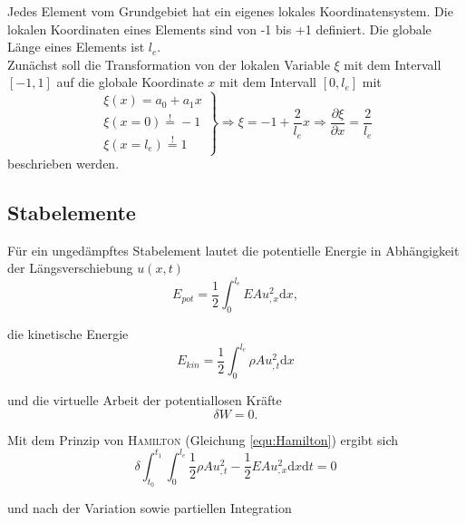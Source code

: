 \documentclass[a4paper,10pt,twoside]{article}
\numberwithin{equation}{section} %
\numberwithin{figure}{section}   %
\numberwithin{table}{section}    %
\begin{document}
	Jedes Element vom Grundgebiet hat ein eigenes lokales Koordinatensystem. Die lokalen Koordinaten eines Elements sind von -1 bis +1 definiert. Die globale Länge eines Elements ist $ l_{e} $.\\
	Zunächst soll die Transformation von der lokalen Variable $\xi$ mit dem Intervall $[-1,1]$ auf die globale Koordinate $x$ mit dem Intervall $ [0,l_{e}] $ mit 
	\begin{equation}\label{equ:lokal-zu-global}
	\left. 
	\begin{array}{l}
	\xi (x) = a_{0} + a_{1}x\\
	\xi (x=0) \overset{!}{=} -1\\
	\xi (x=l_{e})  \overset{!}{=} 1
	\end{array} 
	\right\rbrace \Rightarrow 
	\xi = -1 + \frac{2}{l_{e}}x
	\Rightarrow
	\frac{\partial \xi}{\partial x} = \frac{2}{l_{e}}
	\end{equation}
	beschrieben werden.
	
	\subsection{Stabelemente}\label{sec:längsschwingung-von-stab}
	Für ein ungedämpftes Stabelement lautet die potentielle Energie in Abhängigkeit der Längsverschiebung
	 $ u(x,t) $
	\begin{equation}\label{equ:Stab-pot-Energie}
	E_{pot} = \frac{1}{2} \int_{0}^{l_{e}} EA u_{,x}^{2} \mathrm{d}x,
	\end{equation}
	
	die kinetische Energie
	\begin{equation}\label{equ:Stab-kin-Energie}
	E_{kin} = \frac{1}{2} \int_{0}^{l_{e}} \rho A u_{,t}^{2} \mathrm{d}x
	\end{equation}
	
	und die virtuelle Arbeit der potentiallosen Kräfte
	\begin{equation}\label{equ:Stab-virt-Arbeit}
	\delta W = 0.
	\end{equation}
	
	Mit dem Prinzip von \textsc{Hamilton} (Gleichung \ref{equ:Hamilton}) ergibt sich
	\begin{equation}\label{equ:Stab-Hamilton}
	\delta \int_{t_{0}}^{t_{1}} \int_{0}^{l_{e}} \frac{1}{2} \rho A u_{,t}^{2} - \frac{1}{2} E A u_{,x}^{2} \mathrm{d}x \mathrm{d}t = 0
	\end{equation}
	
	und nach der Variation sowie partiellen Integration
\end{document}
